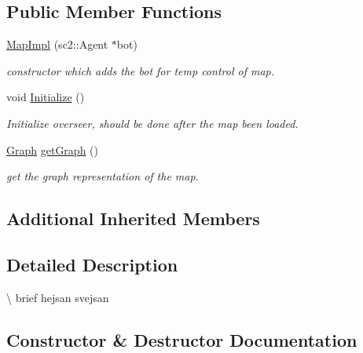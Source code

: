 \subsection*{Public Member Functions}
\begin{DoxyCompactItemize}
\item 
\hyperlink{classOverseer_1_1MapImpl_a9c30887c6f342971fabd54d23b36a765}{Map\+Impl} (sc2\+::\+Agent $\ast$bot)
\begin{DoxyCompactList}\small\item\em constructor which adds the bot for temp control of map. \end{DoxyCompactList}\item 
void \hyperlink{classOverseer_1_1MapImpl_a5ec5b37d1ae07732a99845bfbbfce016}{Initialize} ()\hypertarget{classOverseer_1_1MapImpl_a5ec5b37d1ae07732a99845bfbbfce016}{}\label{classOverseer_1_1MapImpl_a5ec5b37d1ae07732a99845bfbbfce016}

\begin{DoxyCompactList}\small\item\em Initialize overseer, should be done after the map been loaded. \end{DoxyCompactList}\item 
\hyperlink{classOverseer_1_1Graph}{Graph} \hyperlink{classOverseer_1_1MapImpl_abedbb01faa88ff9bd3f8cd2dbec0dead}{get\+Graph} ()\hypertarget{classOverseer_1_1MapImpl_abedbb01faa88ff9bd3f8cd2dbec0dead}{}\label{classOverseer_1_1MapImpl_abedbb01faa88ff9bd3f8cd2dbec0dead}

\begin{DoxyCompactList}\small\item\em get the graph representation of the map. \end{DoxyCompactList}\end{DoxyCompactItemize}
\subsection*{Additional Inherited Members}


\subsection{Detailed Description}
\textbackslash{} brief hejsan svejsan 

\subsection{Constructor \& Destructor Documentation}
